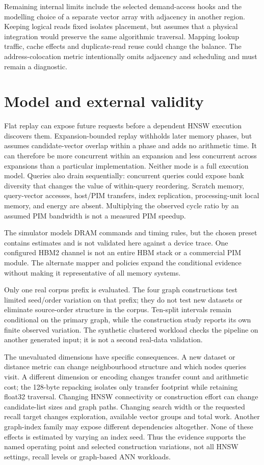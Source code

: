 \documentclass[11pt,a4paper]{report}
\begin{document}
Remaining internal limits include the selected demand-access hooks and the modelling choice of a separate vector array with adjacency in another region. Keeping logical reads fixed isolates placement, but assumes that a physical integration would preserve the same algorithmic traversal. Mapping lookup traffic, cache effects and duplicate-read reuse could change the balance. The address-colocation metric intentionally omits adjacency and scheduling and must remain a diagnostic.

\section{Model and external validity}
Flat replay can expose future requests before a dependent HNSW execution discovers them. Expansion-bounded replay withholds later memory phases, but assumes candidate-vector overlap within a phase and adds no arithmetic time. It can therefore be more concurrent within an expansion and less concurrent across expansions than a particular implementation. Neither mode is a full execution model. Queries also drain sequentially: concurrent queries could expose bank diversity that changes the value of within-query reordering. Scratch memory, query-vector accesses, host/PIM transfers, index replication, processing-unit local memory, and energy are absent. Multiplying the observed cycle ratio by an assumed PIM bandwidth is not a measured PIM speedup.

The simulator models DRAM commands and timing rules, but the chosen preset contains estimates and is not validated here against a device trace. One configured HBM2 channel is not an entire HBM stack or a commercial PIM module. The alternate mapper and policies expand the conditional evidence without making it representative of all memory systems.

Only one real corpus prefix is evaluated. The four graph constructions test limited seed/order variation on that prefix; they do not test new datasets or eliminate source-order structure in the corpus. Ten-split intervals remain conditional on the primary graph, while the construction study reports its own finite observed variation. The synthetic clustered workload checks the pipeline on another generated input; it is not a second real-data validation.

The unevaluated dimensions have specific consequences. A new dataset or distance metric can change neighbourhood structure and which nodes queries visit. A different dimension or encoding changes transfer count and arithmetic cost; the 128-byte repacking isolates only transfer footprint while retaining float32 traversal. Changing HNSW connectivity or construction effort can change candidate-list sizes and graph paths. Changing search width or the requested recall target changes exploration, available vector groups and total work. Another graph-index family may expose different dependencies altogether. None of these effects is estimated by varying an index seed. Thus the evidence supports the named operating point and selected construction variations, not all HNSW settings, recall levels or graph-based ANN workloads.
\end{document}
